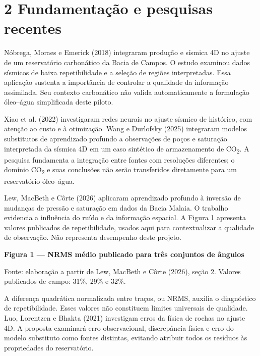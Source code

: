\documentclass[12pt,a4paper]{article}
\begin{document}
\newpage
\section*{2 Fundamentação e pesquisas recentes}
Nóbrega, Moraes e Emerick (2018) integraram produção e sísmica 4D no ajuste de um reservatório carbonático da Bacia de Campos. O estudo examinou dados sísmicos de baixa repetibilidade e a seleção de regiões interpretadas. Essa aplicação sustenta a importância de controlar a qualidade da informação assimilada. Seu contexto carbonático não valida automaticamente a formulação óleo--água simplificada deste piloto.\par
Xiao et al. (2022) investigaram redes neurais no ajuste sísmico de histórico, com atenção ao custo e à otimização. Wang e Durlofsky (2025) integraram modelos substitutos de aprendizado profundo a observações de poços e saturação interpretada da sísmica 4D em um caso sintético de armazenamento de CO\textsubscript{2}. A pesquisa fundamenta a integração entre fontes com resoluções diferentes; o domínio CO\textsubscript{2} e suas conclusões não serão transferidos diretamente para um reservatório óleo--água.\par
Lew, MacBeth e Côrte (2026) aplicaram aprendizado profundo à inversão de mudanças de pressão e saturação em dados da Bacia Malaia. O trabalho evidencia a influência do ruído e da informação espacial. A Figura 1 apresenta valores publicados de repetibilidade, usados aqui para contextualizar a qualidade de observação. Não representa desempenho deste projeto.\par
\noindent\textbf{\small Figura 1 --- NRMS médio publicado para três conjuntos de ângulos}\par
\begin{center}
\end{center}{\noindent\small Fonte: elaboração a partir de Lew, MacBeth e Côrte (2026), seção 2. Valores publicados de campo: 31\%, 29\% e 32\%.\par}
A diferença quadrática normalizada entre traços, ou NRMS, auxilia o diagnóstico de repetibilidade. Esses valores não constituem limites universais de qualidade. Luo, Lorentzen e Bhakta (2021) investigam erros da física de rochas no ajuste 4D. A proposta examinará erro observacional, discrepância física e erro do modelo substituto como fontes distintas, evitando atribuir todos os resíduos às propriedades do reservatório.\par
\end{document}

